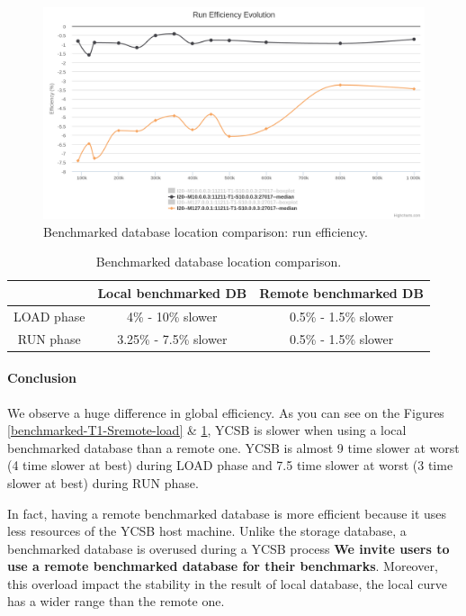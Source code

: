 \documentclass[a4paper,11pt]{report}
\begin{document}
\begin{figure}[ht]
\begin{center}
\includegraphics[width=1\linewidth]{images/evaluation/benchmarked-T1-Sremote-run.png}
\caption{Benchmarked database location comparison: run efficiency.}
\label{benchmarked-T1-Sremote-run}
\end{center}
\end{figure}

\begin{table}[ht]
\begin{center}
	\begin{tabular}{|c|c|c|}
		\hline
		  & Local benchmarked DB & Remote benchmarked DB \\
		\hline
	   	LOAD phase & 4\% - 10\% slower & 0.5\% - 1.5\% slower \\
	   	RUN phase & 3.25\% - 7.5\% slower & 0.5\% - 1.5\% slower \\
	    \hline
	\end{tabular}
	\caption{Benchmarked database location comparison.}
\label{benchmarked-table}
\end{center}
\end{table}

\paragraph{Conclusion}

We observe a huge difference in global efficiency. As you can see on the Figures \ref{benchmarked-T1-Sremote-load} \& \ref{benchmarked-T1-Sremote-run}, YCSB is slower when using a local benchmarked database than a remote one. YCSB is almost 9 time slower at worst (4 time slower at best) during LOAD phase and  7.5 time slower at worst (3 time slower at best) during RUN phase. 

In fact, having a remote benchmarked database is more efficient because it uses less resources of the YCSB host machine. Unlike the storage database, a benchmarked database is overused during a YCSB process \textbf{We invite users to use a remote benchmarked database for their benchmarks}. Moreover, this overload impact the stability in the result of local database, the local curve has a wider range than the remote one.
\end{document}
